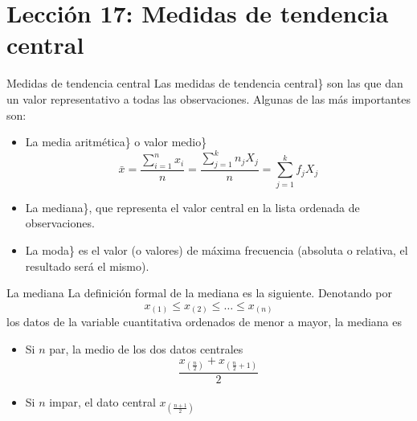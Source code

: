 \documentclass[
  ignorenonframetext,
  aspectratio=169]{beamer}
\providecommand{\tightlist}{%
  \setlength{\itemsep}{0pt}\setlength{\parskip}{0pt}}
\begin{document}
\section{Lección 17: Medidas de tendencia
central}\label{lecciuxf3n-17-medidas-de-tendencia-central}

\begin{frame}{Medidas de tendencia central}
\label{medidas-de-tendencia-central}
Las medidas de tendencia central\} son las que dan un valor
representativo a todas las observaciones. Algunas de las más importantes
son:

\begin{itemize}
\tightlist
\item
  La media aritmética\} o valor medio\}
  \[\bar{x} = \frac{\sum_{i=1}^nx_i}{n}=\frac{\sum_{j=1}^kn_jX_j}{n}=\sum_{j=1}^kf_jX_j\]
\item
  La mediana\}, que representa el valor central en la lista ordenada de
  observaciones.
\item
  La moda\} es el valor (o valores) de máxima frecuencia (absoluta o
  relativa, el resultado será el mismo).
\end{itemize}
\end{frame}

\begin{frame}{La mediana}
\label{la-mediana}
La definición formal de la mediana es la siguiente. Denotando por
\[x_{(1)}\le x_{(2)}\le\dots\le x_{(n)}\] los datos de la variable
cuantitativa ordenados de menor a mayor, la mediana es

\begin{itemize}
\tightlist
\item
  Si \(n\) par, la medio de los dos datos centrales
  \[\frac{x_{(\frac{n}{2})}+x_{(\frac{n}{2}+1)}}{2}\]
\item
  Si \(n\) impar, el dato central \(x_{(\frac{n+1}{2})}\)
\end{itemize}
\end{frame}
\end{document}
